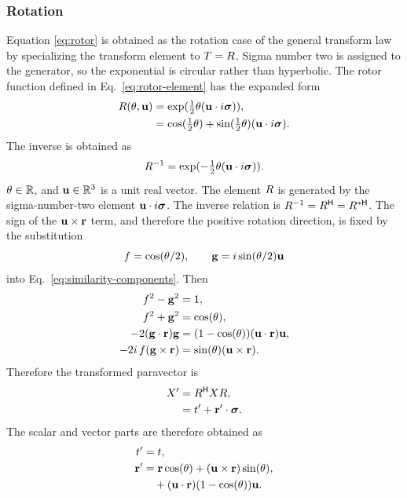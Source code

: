 \subsubsection{Rotation}
Equation \eqref{eq:rotor} is obtained as the rotation case of the general
transform law by specializing the transform element to \(T=R\).
Sigma number two is assigned to the generator, so the exponential is circular
rather than hyperbolic. The rotor function defined in
Eq.\ \eqref{eq:rotor-element} has the expanded form
\begin{align*}
R(\theta ,\mathbf{u}) &= \exp( \tfrac{1}{2} \theta (\mathbf{u} \cdot i \mathbf{\bm{\sigma}} ) ),\notag \\
&= \cos( \tfrac{1}{2} \theta ) + \sin( \tfrac{1}{2} \theta ) (\mathbf{u} \cdot i \mathbf{\bm{\sigma}} ).
\end{align*}
The inverse is obtained as
\begin{equation*}
R^{-1} = \exp( -\tfrac{1}{2} \theta (\mathbf{u} \cdot i \mathbf{\bm{\sigma}} ) ).
\end{equation*}
\(\theta\in\mathbb{R}\), and \(\mathbf{u}\in\mathbb{R}^3\) is a unit real vector. The element
\(R\) is generated by the sigma-number-two element
\(\mathbf{u}\cdot i\mathbf{\bm{\sigma}}\). The
inverse relation is
\(R^{-1}=R^{\mathsf H}=R^{*\mathsf H}\).
The sign of the \(\mathbf{u}\times\mathbf{r}\) term, and therefore the positive
rotation direction, is fixed by the substitution
\begin{equation*}
f=\cos(\theta/2),
\qquad
\mathbf{g}=i\sin(\theta/2)\mathbf{u}
\end{equation*}
into Eq.\ \eqref{eq:similarity-components}. Then
\begin{align*}
f^2-\mathbf{g}^2&=1,\\
f^2+\mathbf{g}^2&=\cos(\theta),\\
-2(\mathbf{g}\cdot\mathbf{r})\mathbf{g}
&=(1-\cos(\theta))(\mathbf{u}\cdot\mathbf{r})\mathbf{u},\\
-2i\,f(\mathbf{g}\times\mathbf{r})
&=\sin(\theta)(\mathbf{u}\times\mathbf{r}).
\end{align*}
Therefore the transformed paravector is
\begin{align*}
X' &= R^{\mathsf H} X R,\notag \\
&= t' + \mathbf{r}' \cdot \mathbf{\bm{\sigma}}.
\end{align*}
The scalar and vector parts are therefore obtained as
\begin{align*}
t' &= t,\notag \\
\mathbf{r}' &= \mathbf{r} \cos(\theta ) + (\mathbf{u} \times \mathbf{r}) \sin(\theta ),\notag \\
&\quad + (\mathbf{u} \cdot \mathbf{r}) (1 - \cos(\theta )) \mathbf{u}.
\end{align*}
